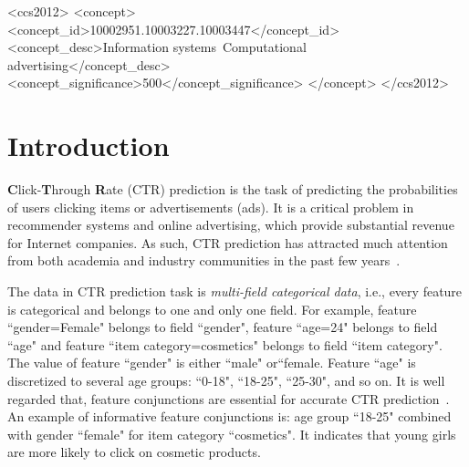 \documentclass[sigconf]{acmart}
\begin{document}
\begin{CCSXML}
<ccs2012>
<concept>
<concept_id>10002951.10003227.10003447</concept_id>
<concept_desc>Information systems~Computational advertising</concept_desc>
<concept_significance>500</concept_significance>
</concept>
</ccs2012>
\end{CCSXML}


\maketitle

\section{Introduction}
\textbf{C}lick-\textbf{T}hrough \textbf{R}ate (CTR) prediction is the task of predicting the probabilities of users clicking items or advertisements (ads). 
It is a critical problem in recommender systems and online advertising, which provide substantial revenue for Internet companies. 
As such, CTR prediction has attracted much attention from both academia and industry communities in the past few years~\citep{liu2017pbodl,chapelle2015simple,mcmahan2013ad,graepel2010web, zhou2018deep}.  


The data in CTR prediction task is \textit{multi-field categorical data}, i.e., every feature is categorical and belongs to one and only one field. 
For example, feature ``gender=Female" belongs to field ``gender", feature ``age=24" belongs to field ``age" and feature ``item category=cosmetics" belongs to field ``item category". The value of  feature ``gender" is either ``male"  or``female.  Feature ``age" is discretized to several age groups: ``0-18", ``18-25", ``25-30", and so on. 
It is well regarded that, feature conjunctions are essential for accurate CTR prediction~\citep{cheng2016wide, covington2016deep, he2017neural, lian2018xdeepfm, guo2017deepfm}. 
An example of informative feature conjunctions is: age group ``18-25" combined with gender ``female" for item category ``cosmetics". It indicates that young girls are more likely to click on cosmetic products. 
\end{document}
